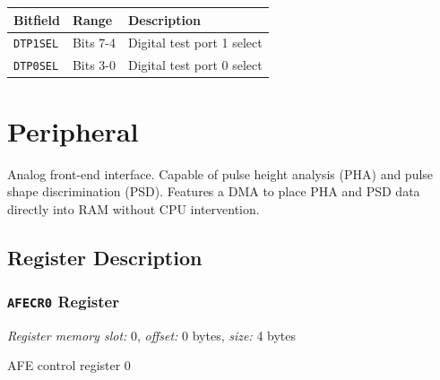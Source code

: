 \begin{tabularx}{\textwidth}{ l l l X }
\textbf{Bitfield} & \textbf{Range} & \multicolumn{2}{X}{\textbf{Description}} \\ \hline
\texttt{DTP1SEL} & Bits 7-4 & \multicolumn{2}{X}{Digital test port 1 select} \\
\hline
\texttt{DTP0SEL} & Bits 3-0 & \multicolumn{2}{X}{Digital test port 0 select} \\
\hline
\end{tabularx}

\newpage



\section{ Peripheral} \label{peripheralAFEx}
Analog front-end interface. Capable of pulse height analysis (PHA) and pulse shape discrimination (PSD). Features a DMA to place PHA and PSD data directly into RAM without CPU intervention.

\subsection{Register Description}

\subsubsection{\texttt{AFECR0} Register} \label{ss:AFExCR0}
\noindent \textit{Register memory slot:} 0, \textit{offset:} 0 bytes, \textit{size:} 4 bytes

\noindent AFE control register 0

